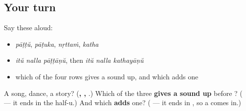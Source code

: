 \subsection*{Your turn}
Say these aloud:

\begin{itemize}
\raggedright
  \item \emph{pāṭṭŭ}, \emph{pāṭuka}, \emph{nṛttaṁ}, \emph{katha}
  \item \emph{itŭ nalla pāṭṭāṇŭ}, then \emph{itŭ nalla kathayāṇŭ}
  \item which of the four rows gives a sound up, and which adds one
\end{itemize}

\begin{tcolorbox}[breakable,colback=teal!4,colframe=teal!35!black,title={Before you move on}]
A song, dance, a story? (\textbf{, , }.) Which of the three \textbf{gives a sound up} before \textbf{}? (\textbf{} — it ends in the half-u.) And which \textbf{adds} one? (\textbf{} — it ends in \textbf{}, so a \textbf{} comes in.)
\end{tcolorbox}
